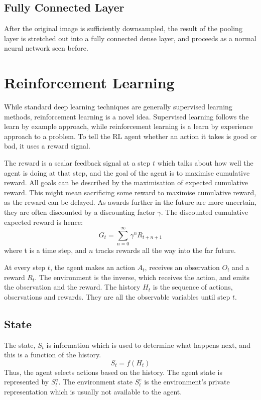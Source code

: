 \documentclass{article}
\begin{document}
\subsection{Fully Connected Layer}
After the original image is sufficiently downsampled, the result of the pooling layer is stretched out into a fully connected dense layer, and proceeds as a normal neural network seen before.


\section{Reinforcement Learning}

While standard deep learning techniques are generally supervised learning methods, reinforcement learning is a novel idea. Supervised learning follows the learn by example approach, while reinforcement learning is a learn by experience approach to a problem. To tell the RL agent whether an action it takes is good or bad, it uses a reward signal.

The reward is a scalar feedback signal at a step $t$ which talks about how well the agent is doing at that step, and the goal of the agent is to maximise cumulative reward. All goals can be described by the maximisation of expected cumulative reward. This might mean sacrificing some reward to maximise cumulative reward, as the reward can be delayed. As awards further in the future are more uncertain, they are often discounted by a discounting factor $\gamma$. The discounted cumulative expected reward is hence:
$$G_t = \sum_{n=0}^{\infty} \gamma^n R_{t+n+1}$$ where t is a time step, and $n$ tracks rewards all the way into the far future.

At every step $t$, the agent makes an action $A_t$, receives an observation $O_t$ and a reward $R_t$. The environment is the inverse, which receives the action, and emits the observation and the reward. The history $H_t$ is the sequence of actions, observations and rewards. They are all the observable variables until step $t$. 

\subsection{State}
The state, $S_t$ is information which is used to determine what happens next, and this is a function of the history. 
$$S_t = f(H_t)$$
Thus, the agent selects actions based on the history. The agent state is represented by $S_t^a$. The environment state $S_t^e$ is the environment's private representation which is usually not available to the agent. 
\end{document}
